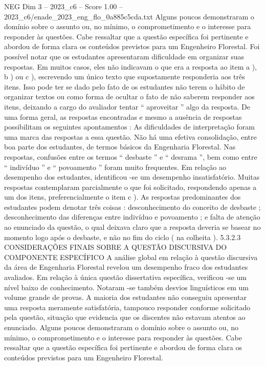 \begin{textsample}{NEG Dim 3 – 2023\_c6 – Score 1.00 – 2023\_c6/enade\_2023\_eng\_flo\_0a885c5cda.txt}
Alguns poucos demonstraram o domínio sobre o assunto ou, no mínimo, o comprometimento e o interesse para responder às questões.
Cabe ressaltar que a questão específica foi pertinente e abordou de forma clara os conteúdos previstos para um Engenheiro Florestal.
Foi possível notar que os estudantes apresentaram dificuldade em organizar suas respostas.
Em muitos casos, eles não indicavam o que era a resposta ao item a ), b ) ou c ), escrevendo um único texto que supostamente responderia aos três itens.
Isso pode ter se dado pelo fato de os estudantes não terem o hábito de organizar textos ou como forma de ocultar o fato de não saberem responder aos itens, deixando a cargo do avaliador tentar “ aproveitar ” algo da resposta.
De uma forma geral, as respostas encontradas e mesmo a ausência de respostas possibilitam os seguintes apontamentos : As dificuldades de interpretação foram uma marca das respostas a essa questão.
Não há uma efetiva consolidação, entre boa parte dos estudantes, de termos básicos da Engenharia Florestal.
Nas respostas, confusões entre os termos “ desbaste ” e “ desrama ”, bem como entre “ indivíduo ” e “ povoamento ” foram muito frequentes.
Em relação ao desempenho dos estudantes, identificou -se um desempenho insatisfatório.
Muitas respostas contemplaram parcialmente o que foi solicitado, respondendo apenas a um dos itens, preferencialmente o item c ).
As respostas predominantes dos estudantes podem denotar três coisas : desconhecimento do conceito de desbaste ; desconhecimento das diferenças entre indivíduo e povoamento ; e falta de atenção ao enunciado da questão, o qual deixava claro que a resposta deveria se basear no momento logo após o desbaste, e não no fim do ciclo ( na colheita ). 5.3.2.3 CONSIDERAÇÕES FINAIS SOBRE A QUESTÃO DISCURSIVA DO COMPONENTE ESPECÍFICO A análise global em relação à questão discursiva da área de Engenharia Florestal revelou um desempenho fraco dos estudantes avaliados.
Em relação à única questão dissertativa específica, verificou -se um nível baixo de conhecimento.
Notaram -se também desvios linguísticos em um volume grande de provas.
A maioria dos estudantes não conseguiu apresentar uma resposta meramente satisfatória, tampouco responder conforme solicitado pela questão, situação que evidencia que os discentes não estavam atentos ao enunciado.
Alguns poucos demonstraram o domínio sobre o assunto ou, no mínimo, o comprometimento e o interesse para responder às questões.
Cabe ressaltar que a questão específica foi pertinente e abordou de forma clara os conteúdos previstos para um Engenheiro Florestal.

\end{textsample}
